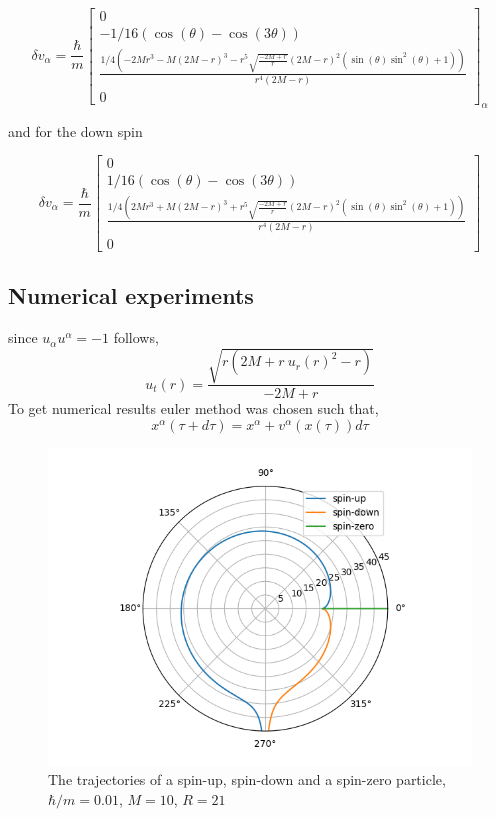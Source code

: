 \documentclass[12pt,a4paper]{article}
\begin{document}
	$$
	\delta v_\alpha = \frac{\hbar}{m} \left[\begin{matrix}0\\- 1/16 \left( \cos{\left(\theta \right)} - \cos{\left(3 \theta \right)}\right)\\\frac{1/4 \left(- 2 M r^{3} - M  \left(2 M - r\right)^{3} - r^{5} \sqrt{\frac{- 2 M + r}{r}} \left(2 M - r\right)^{2} \left(\sin{\left(\theta \right)} \sin^{2}{\left(\theta \right)} + 1\right)\right)}{r^{4}  \left(2 M - r\right)}\\0\end{matrix}\right]_\alpha
	$$
	
	and for the down spin
	
	$$
	\delta v_\alpha = \frac{\hbar}{m}\left[\begin{matrix}0\\1/16 \left( \cos{\left(\theta\right)} - \cos{\left(3\theta \right)}\right)\\\frac{1/4  \left(2 M r^{3} + M  \left(2 M - r\right)^{3} + r^{5} \sqrt{\frac{- 2 M + r}{r}} \left(2 M - r\right)^{2} \left(\sin{\left(\theta \right)} \sin^{2}{\left(\theta \right)} + 1\right)\right)}{r^{4}  \left(2 M - r\right)}\\0\end{matrix}\right]
	$$
	
	\subsection{Numerical experiments}
	since $u_\alpha u^\alpha = -1$ follows,
	$$
	u_t(r) = \frac{\sqrt{r \left(2 M + r \ {u_{r}(r)}^{2} - r\right)}}{- 2 M + r} 
	$$
	To get numerical results euler method was chosen such that,
		$$
	x^\alpha(\tau + d\tau) = x^\alpha + v^\alpha(x(\tau))d\tau
	$$
	
	\begin{figure}
		\includegraphics[width=\linewidth]{trajectory.png}
		\caption{The trajectories of a spin-up, spin-down and a spin-zero particle, $\hbar /m = 0.01$, $M=10$, $R=21$}
		\label{fig:trajectories}
	\end{figure}
	
\end{document}
